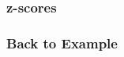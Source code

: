 \documentclass[handout]{beamer}
\newcommand{\blue}[1]{\textcolor{blue2}{#1}}
\begin{document}
\begin{frame}
\frametitle{z-scores}
%
%
%
%
%
%
%
%
%
%
%
%
%
\end{frame}


\begin{frame}
\frametitle{Back to Example}
%
%
%

\end{frame}
\end{document}
